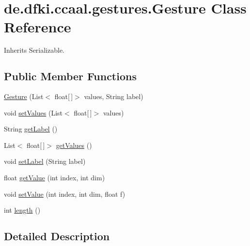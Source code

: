 \hypertarget{classde_1_1dfki_1_1ccaal_1_1gestures_1_1_gesture}{\section{de.\-dfki.\-ccaal.\-gestures.\-Gesture Class Reference}
\label{classde_1_1dfki_1_1ccaal_1_1gestures_1_1_gesture}
}


Inherits Serializable.

\subsection*{Public Member Functions}
\begin{DoxyCompactItemize}
\item 
\hyperlink{classde_1_1dfki_1_1ccaal_1_1gestures_1_1_gesture_a22c5b8bcde2ff31065caf87e6ab418d1}{Gesture} (List$<$ float\mbox{[}$\,$\mbox{]}$>$ values, String label)
\item 
void \hyperlink{classde_1_1dfki_1_1ccaal_1_1gestures_1_1_gesture_a1949f9295332f13bb38e93a66e4d7b61}{set\-Values} (List$<$ float\mbox{[}$\,$\mbox{]}$>$ values)
\item 
String \hyperlink{classde_1_1dfki_1_1ccaal_1_1gestures_1_1_gesture_abc9699ac1ab0f31b380541392a1a4c78}{get\-Label} ()
\item 
List$<$ float\mbox{[}$\,$\mbox{]}$>$ \hyperlink{classde_1_1dfki_1_1ccaal_1_1gestures_1_1_gesture_a464534de965db81c9504947a3af6356d}{get\-Values} ()
\item 
void \hyperlink{classde_1_1dfki_1_1ccaal_1_1gestures_1_1_gesture_a38265a3266adf5d7279216b7282d9149}{set\-Label} (String label)
\item 
float \hyperlink{classde_1_1dfki_1_1ccaal_1_1gestures_1_1_gesture_a9f81dca525be9c8d1d663cee41cc1d4b}{get\-Value} (int index, int dim)
\item 
void \hyperlink{classde_1_1dfki_1_1ccaal_1_1gestures_1_1_gesture_aa46322f5dbbc227b3f6eca79eff8e5d2}{set\-Value} (int index, int dim, float f)
\item 
int \hyperlink{classde_1_1dfki_1_1ccaal_1_1gestures_1_1_gesture_a727f7d351f8eeac8f0a089660eb155f2}{length} ()
\end{DoxyCompactItemize}


\subsection{Detailed Description}


